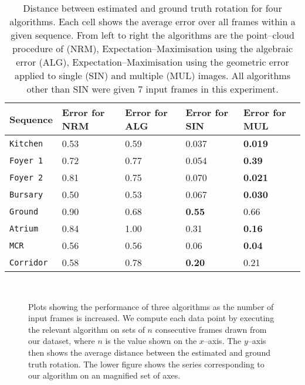 \begin{table}[tb]
  \centering
  \begin{tabular}{@{}p{2cm}p{3cm}p{3cm}p{3cm}p{3cm}@{}}
    \toprule
    Sequence & Error for NRM & Error for ALG & Error for SIN & Error
    for MUL \\
    \midrule
    \tt{Kitchen}  & 0.53   & 0.59   & 0.037  & \textbf{0.019} \\
    \tt{Foyer 1}   & 0.72   & 0.77   & 0.054  & \textbf{0.39} \\
    \tt{Foyer 2}  & 0.81   & 0.75   & 0.070  & \textbf{0.021} \\
    \tt{Bursary}  & 0.50   & 0.53   & 0.067  & \textbf{0.030} \\
    \tt{Ground}   & 0.90   & 0.68   & \textbf{0.55}   & 0.66 \\
    \tt{Atrium}   & 0.84   & 1.00   & 0.31  & \textbf{0.16} \\
    \tt{MCR}      & 0.56   & 0.56   & 0.06  & \textbf{0.04} \\
    \tt{Corridor} & 0.58   & 0.78   & \textbf{0.20}  & 0.21 \\
    \bottomrule
  \end{tabular}
  \vspace{0.2cm}
  \caption{Distance between estimated and ground truth rotation for
    four algorithms. Each cell shows the average error over all frames
    within a given sequence. From left to right the algorithms are
    the point--cloud procedure of \cite{Furukawa09} (NRM),
    Expectation--Maximisation using the algebraic error (ALG),
    Expectation--Maximisation using the geometric error applied to
    single (SIN) and multiple (MUL) images. All algorithms other than
    SIN were given 7 input frames in this experiment.}
  \label{table:rot-performance}
\end{table}

\begin{figure}[p]
  \centering
  \\
  \caption{Plots showing the performance of three algorithms as the
    number of input frames is increased. We compute each data point by
    executing the relevant algorithm on sets of $n$ consecutive frames
    drawn from our dataset, where $n$ is the value shown on the
    $x$--axis. The $y$--axis then shows the average distance between
    the estimated and ground truth rotation. The lower figure shows
    the series corresponding to our algorithm on an magnified set of
    axes.}
  \label{fig:error-vs-nframes}
\end{figure}



